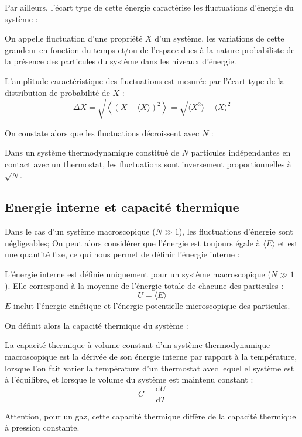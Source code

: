 \documentclass[11pt,fleqn]{book} %
\newcommand{\dd}{\mathrm{d}}
\begin{document}
Par ailleurs, l'écart type de cette énergie caractérise les fluctuations d'énergie du système :
\begin{definition}[Fluctuations]
	On appelle fluctuation d'une propriété $X$ d'un système, les variations de cette grandeur en fonction du temps et/ou de l'espace dues à la nature probabiliste de la présence des particules du système dans les niveaux d'énergie.
	
	L'amplitude caractéristique des fluctuations est mesurée par l'écart-type de la distribution de probabilité de $X$ :
	\begin{equation}
		\Delta X = \sqrt{\left\langle (X - \langle X \rangle)^2 \right \rangle} = \sqrt{\langle X^2 \rangle - \langle X \rangle^2}
	\end{equation}
\end{definition}

On constate alors que les fluctuations décroissent avec $N$ :
\begin{proposition}
	Dans un système thermodynamique constitué de $N$ particules indépendantes en contact avec un thermostat, les fluctuations sont inversement proportionnelles à $\sqrt{N}$.
\end{proposition}

\subsection{Energie interne et capacité thermique}

Dans le cas d'un système macroscopique ($N \gg 1$), les fluctuations d'énergie sont négligeables; On peut alors considérer que l'énergie est toujours égale à $\langle E \rangle$ et est une quantité fixe, ce qui nous permet de définir l'énergie interne :
\begin{definition}
	L'énergie interne est définie uniquement pour un système macroscopique ($N \gg 1$). Elle correspond à la moyenne de l'énergie totale de chacune des particules :
	\begin{equation}
		U = \langle E \rangle
	\end{equation}
	$E$ inclut l'énergie cinétique et l'énergie potentielle microscopique des particules.
\end{definition}

On définit alors la capacité thermique du système :
\begin{definition}
	La capacité thermique à volume constant d'un système thermodynamique macroscopique est la dérivée de son énergie interne par rapport à la température, lorsque l'on fait varier la température d'un thermostat avec lequel el système est à l'équilibre, et lorsque le volume du système est maintenu constant :
	\begin{equation}
		C = \frac{\dd U}{\dd T}
	\end{equation}
\end{definition}
\begin{remark}
	Attention, pour un gaz, cette capacité thermique diffère de la capacité thermique à pression constante.
\end{remark}
\end{document}
